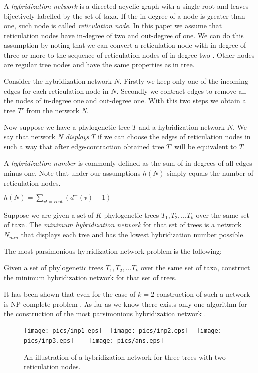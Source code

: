 \documentclass[runningheads, envcountsame, a4paper]{llncs}
\begin{document}
A \emph{hybridization network} is a directed acyclic graph 
with a single root and leaves bijectively labelled by the set of taxa. If the in-degree of a node is greater than one, 
such node is called \emph{reticulation node}. In this paper we assume that reticulation nodes have in-degree of two and 
out-degree of one. We can do this assumption by noting that we can convert a reticulation node with in-degree 
of three or more to the sequence of reticulation nodes of in-degree two \cite{wu2010close}. Other nodes are regular 
tree nodes and have the same properties as in tree.

Consider the hybridization network $N$. Firstly we keep only one of the incoming edges for each reticulation node in $N$. 
Secondly we contract edges to remove all the nodes of in-degree one and out-degree one. With this two steps we obtain a 
tree $T'$ from the network $N$.

Now suppose we have a phylogenetic tree $T$ and a hybridization network $N$. We say that network $N$ \emph{displays} $T$ 
if we can choose the edges of reticulation nodes in such a way that after edge-contraction obtained tree $T'$ will be 
equivalent to $T$.

A \emph{hybridization number} is commonly defined as the sum of in-degrees of all edges minus one. Note that under our 
assumptions $h(N)$ simply equals the number of reticulation nodes.

$h(N) = \sum\limits_{v != root} (d^-(v) - 1)$

Suppose we are given a set of $K$ phylogenetic trees $T_1, T_2, ... T_k$ over the same set of taxa. The \emph{minimum 
hybridization network} for that set of trees is a network $N_{min}$ that displays each tree and has the lowest 
hybridization number possible.

The most parsimonious hybridization network problem is the following:

Given a set of phylogenetic trees $T_1, T_2, ... T_k$ over the same set of taxa, construct the minimum hybridization 
network for that set of trees.

It has been shown that even for the case of $k=2$ construction of such a network is NP-complete problem 
\cite {bordewich2007computing}. As far as we know there exists only one algorithm for the construction of the most 
parsimonious hybridization network \cite {wu2013algorithm}.

\begin{figure}[t]
  \centering
  \texttt{[image: pics/inp1.eps]}
  ~
  \texttt{[image: pics/inp2.eps]}
  ~
  \texttt{[image: pics/inp3.eps]}
  ~~~
  \texttt{[image: pics/ans.eps]}
  \caption{An illustration of a hybridization network for three trees with two reticulation nodes.}
  \label{network-example}
\end{figure}
\end{document}
